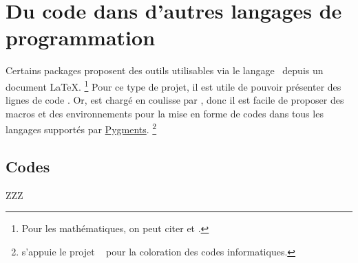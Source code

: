 \documentclass{../main/main}
\begin{document}
\section{Du code dans d'autres langages de programmation}

Certains packages proposent des outils utilisables via le langage \lua\ depuis un document \LaTeX.%
\footnote{
	Pour les mathématiques, on peut citer  et .
}
Pour ce type de projet, il est utile de pouvoir présenter des lignes de code \lua. Or,  est chargé en coulisse par \thisproj, donc il est facile de proposer des macros et des environnements pour la mise en forme de codes dans tous les langages supportés par \href{https://pygments.org/}{Pygments}.%
\footnote{
	 s'appuie le projet \python\  pour la coloration des codes informatiques.
}



\subsection{Codes }

ZZZ
\end{document}
